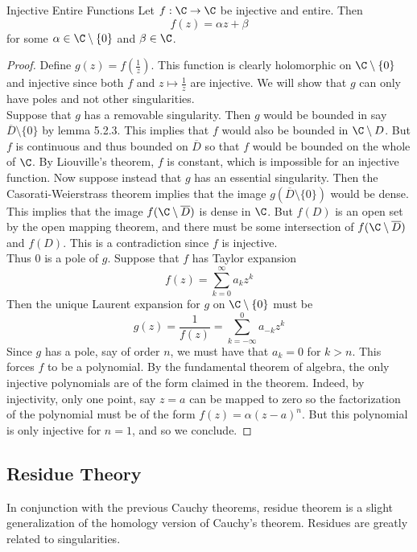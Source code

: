\documentclass[a4paper]{article}
\begin{document}
\begin{thm}{Injective Entire Functions}{} Let $f:\C\to\C$ be injective and entire. Then $$f(z)=\alpha z+\beta$$ for some $\alpha\in\C\setminus\{0\}$ and $\beta\in\C$. 
\begin{proof}
Define $g(z)=f\left(\frac{1}{z}\right)$. This function is clearly holomorphic on $\C\setminus\{0\}$ and injective since both $f$ and $z\mapsto\frac{1}{z}$ are injective. We will show that $g$ can only have poles and not other singularities. \\

Suppose that $g$ has a removable singularity. Then $g$ would be bounded in say $\overline{D}\setminus\{0\}$ by lemma 5.2.3. This implies that $f$ would also be bounded in $\C\setminus D$. But $f$ is continuous and thus bounded on $\overline{D}$ so that $f$ would be bounded on the whole of $\C$. By Liouville's theorem, $f$ is constant, which is impossible for an injective function. Now suppose instead that $g$ has an essential singularity. Then the Casorati-Weierstrass theorem implies that the image $g(\overline{D}\setminus\{0\})$ would be dense. This implies that the image $f(\C\setminus\overline{D})$ is dense in $\C$. But $f(D)$ is an open set by the open mapping theorem, and there must be some intersection of $f(\C\setminus\overline{D})$ and $f(D)$. This is a contradiction since $f$ is injective. \\

Thus $0$ is a pole of $g$. Suppose that $f$ has Taylor expansion $$f(z)=\sum_{k=0}^\infty a_kz^k$$ Then the unique Laurent expansion for $g$ on $\C\setminus\{0\}$ must be $$g(z)=\frac{1}{f(z)}=\sum_{k=-\infty}^0 a_{-k}z^k$$ Since $g$ has a pole, say of order $n$, we must have that $a_k=0$ for $k>n$. This forces $f$ to be a polynomial. By the fundamental theorem of algebra, the only injective polynomials are of the form claimed in the theorem. Indeed, by injectivity, only one point, say $z=a$ can be mapped to zero so the factorization of the polynomial must be of the form $f(z)=\alpha(z-a)^n$. But this polynomial is only injective for $n=1$, and so we conclude. 
\end{proof}
\end{thm}

\subsection{Residue Theory}
In conjunction with the previous Cauchy theorems, residue theorem is a slight generalization of the homology version of Cauchy's theorem. Residues are greatly related to singularities. 
\end{document}
